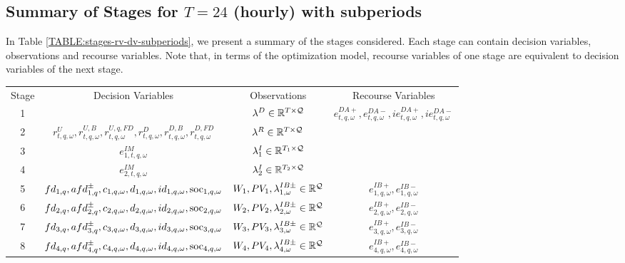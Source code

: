 \subsection{\texorpdfstring{Summary of Stages for $T = 24$ (hourly) with subperiods}{Summary of Stages for T = 24 (hourly) with subperiods}}

In Table \ref{TABLE:stages-rv-dv-subperiods}, we present a summary of the stages considered. Each stage can contain decision variables, observations and recourse variables. Note that, in terms of the optimization model, recourse variables of one stage are equivalent to decision variables of the next stage.

\begin{table}[H]
\begin{tabular}{c c c c}
	Stage & Decision Variables & Observations & Recourse Variables \\
	1 & & $\lambda^D \in \mathbb{R}^{T\times \mathcal{Q}}$& $e^{DA+}_{t,q, \omega}, e^{DA-}_{t,q, \omega}, ie^{DA+}_{t,q, \omega}, ie^{DA-}_{t,q, \omega}$\\
	2 & $r^U_{t,q, \omega}, r^{U, B}_{t,q, \omega}, r^{U,q, FD}_{t,q, \omega}, r^{D}_{t,q, \omega}, r^{D, B}_{t,q, \omega}, r^{D, FD}_{t,q, \omega}$ & $\lambda^R \in \mathbb{R}^{T\times \mathcal{Q}}$& \\
	3 & $e^{IM}_{1, t, q,\omega}$& $\lambda^I_1 \in \mathbb{R}^{T_1 \times \mathcal{Q}}$&  \\
	4 & $e^{IM}_{2, t,q, \omega}$& $\lambda^I_2 \in \mathbb{R}^{T_2 \times \mathcal{Q}}$&  \\
	5 & $fd_{1,q}, afd^{\pm}_{1,q}, c_{1,q, \omega}, d_{1,q, \omega}, id_{1,q, \omega}, \text{soc}_{1,q, \omega}$& $W_1, PV_1, \lambda^{IB\pm}_{1, \omega} \in \mathbb{R}^\mathcal{Q}$& $e^{IB+}_{1,q, \omega}, e^{IB-}_{1,q, \omega}$\\
	6 & $fd_{2,q}, afd^{\pm}_{2,q}, c_{2, q,\omega}, d_{2, q,\omega}, id_{2,q, \omega}, \text{soc}_{2, q,\omega}$& $W_2, PV_2, \lambda^{IB\pm}_{2, \omega} \in \mathbb{R}^\mathcal{Q}$& $e^{IB+}_{2, q,\omega}, e^{IB-}_{2,q, \omega}$\\
	7& $fd_{3,q}, afd^{\pm}_{3,q}, c_{3,q, \omega}, d_{3,q, \omega}, id_{3,q, \omega}, \text{soc}_{3, q,\omega}$& $W_3, PV_3, \lambda^{IB\pm}_{3, \omega} \in \mathbb{R}^\mathcal{Q}$& $e^{IB+}_{3,q, \omega}, e^{IB-}_{3, q,\omega}$\\
	8& $fd_{4,q}, afd^{\pm}_{4,q}, c_{4, q,\omega}, d_{4,q, \omega}, id_{4, q,\omega}, \text{soc}_{4, q,\omega}$& $W_4, PV_4, \lambda^{IB\pm}_{4, \omega} \in \mathbb{R}^\mathcal{Q}$& $e^{IB+}_{4, q,\omega}, e^{IB-}_{4, q,\omega}$\\

\end{tabular}
\end{table}
